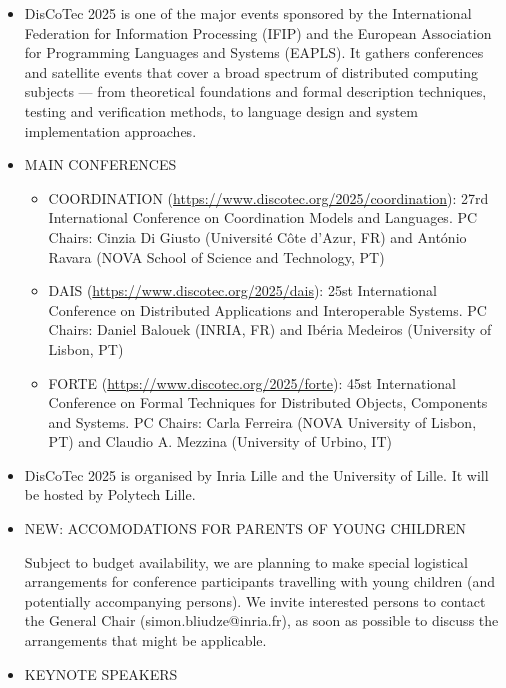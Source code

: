 \documentclass[prodmode,acmtecs]{acmsmall} %
\begin{document}
\begin{itemize}\item  DisCoTec 2025 is one of the major events sponsored by the International Federation for Information Processing (IFIP) and the European Association for Programming Languages and Systems (EAPLS). It gathers conferences and satellite events that cover a broad spectrum of distributed computing subjects — from theoretical foundations and formal description techniques, testing and verification methods, to language design and system implementation approaches. 
 
\item  MAIN CONFERENCES  
 
\begin{itemize}\item  COORDINATION (\href{https://www.discotec.org/2025/coordination}{https://www.discotec.org/2025/coordination}): 27rd International Conference on Coordination Models and Languages.  PC Chairs: Cinzia Di Giusto (Université Côte d’Azur, FR) and António Ravara (NOVA School of Science and Technology, PT)
\item  DAIS (\href{https://www.discotec.org/2025/dais}{https://www.discotec.org/2025/dais}): 25st International Conference on Distributed Applications and Interoperable Systems. PC Chairs: Daniel Balouek (INRIA, FR) and Ibéria Medeiros (University of Lisbon, PT)
\item  FORTE (\href{https://www.discotec.org/2025/forte}{https://www.discotec.org/2025/forte}): 45st International Conference on Formal Techniques for Distributed Objects, Components and Systems. PC Chairs: Carla Ferreira (NOVA University of Lisbon, PT) and Claudio A. Mezzina (University of Urbino, IT)
\end{itemize} 
\item  DisCoTec 2025 is organised by Inria Lille and the University of Lille. It will be hosted by Polytech Lille. 
 
\item  NEW: ACCOMODATIONS FOR PARENTS OF YOUNG CHILDREN 
 
  Subject to budget availability, we are planning to make special logistical arrangements for conference participants travelling with young children (and potentially accompanying persons). We invite interested persons to contact the General Chair (simon.bliudze@inria.fr), as soon as possible to discuss the arrangements that might be applicable. 
 
\item  KEYNOTE SPEAKERS  
 

\end{itemize}
\end{document}

